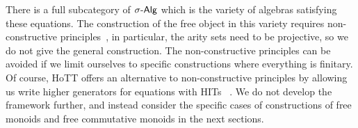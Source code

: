 There is a full subcategory of $\sigAlg$ which is the variety of algebras satisfying these equations.
%
The construction of the free object in this variety requires non-constructive principles~\cite[Section 7, pg 142]{blassWordsFreeAlgebras1983},
in particular, the arity sets need to be projective, so we do not give the general construction.
%
The non-constructive principles can be avoided if we limit ourselves to specific constructions
where everything is finitary.
%
Of course, HoTT offers an alternative to non-constructive principles by allowing us
write higher generators for equations with HITs
~\cite{univalentfoundationsprogramHomotopyTypeTheory2013}.
%
We do not develop the framework further, and instead consider the specific cases of constructions of free monoids and free commutative monoids in the next sections.
